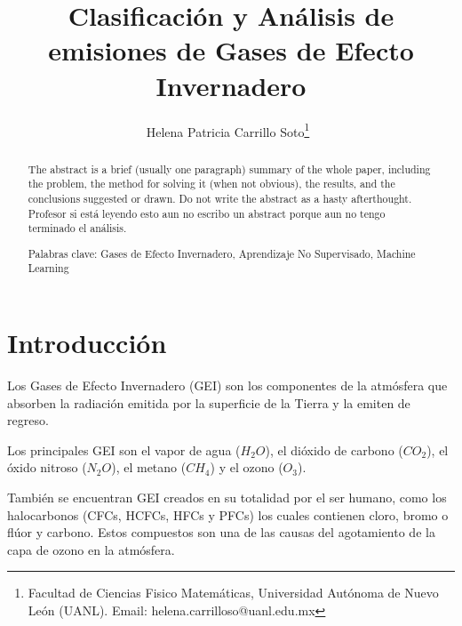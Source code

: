 \documentclass[12pt]{article}
\title{Clasificación y Análisis de emisiones de Gases de Efecto Invernadero}
\author{
Helena Patricia Carrillo Soto\thanks{Facultad de Ciencias Fisico Matemáticas, Universidad Autónoma de Nuevo León (UANL). Email: helena.carrilloso@uanl.edu.mx}\
}
\date{} %
\newcommand{\jhead}{Universidad Autónoma de Nuevo León}
\newcommand{\jdate}{Octubre 2023}
\begin{document}


\maketitle
\thispagestyle{firstpage}

\begin{abstract}

The abstract is a brief (usually one paragraph) summary
of the whole paper, including the problem, the method for solving
it (when not obvious), the results, and the conclusions suggested
or drawn.  Do not write the abstract as a hasty
afterthought. Profesor si está leyendo esto aun no escribo un abstract porque aun no tengo terminado el análisis.


\smallskip
\noindent
Palabras clave: Gases de Efecto Invernadero, Aprendizaje No Supervisado, Machine Learning
\end{abstract}


\setlength{\baselineskip}{16pt plus.2pt}

\section{Introducción}

Los Gases de Efecto Invernadero (GEI) son los componentes de la atmósfera que absorben la radiación emitida por la superficie de la Tierra y la emiten de regreso. 

Los principales GEI son el vapor de agua ($H_2O$), el dióxido de carbono ($CO_2$), el óxido nitroso ($N_2O$), el metano ($CH_4$) y el ozono ($O_3$). 

También se encuentran GEI creados en su totalidad por el ser humano, como los halocarbonos (CFCs, HCFCs, HFCs y PFCs) los cuales contienen cloro, bromo o flúor y carbono. Estos compuestos son una de las causas del agotamiento de la capa de ozono en la atmósfera.

\end{document}
